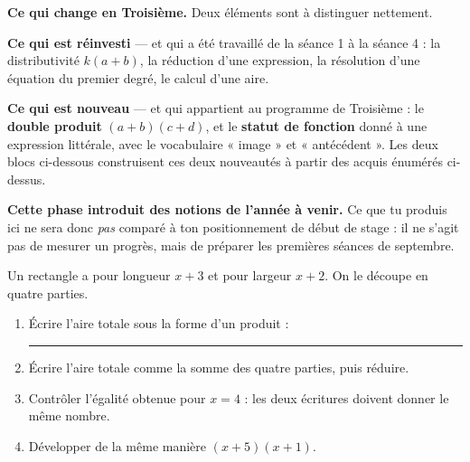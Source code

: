 \documentclass[10pt,a4paper]{article}
\begin{document}
\begin{methodbox}
\textbf{Ce qui change en Troisième.} Deux éléments sont à distinguer nettement.
\par\smallskip
\textbf{Ce qui est réinvesti} — et qui a été travaillé de la séance 1 à la séance 4 : la distributivité
$k(a+b)$, la réduction d'une expression, la résolution d'une équation du premier degré, le calcul d'une aire.
\par\smallskip
\textbf{Ce qui est nouveau} — et qui appartient au programme de Troisième : le \textbf{double produit}
$(a+b)(c+d)$, et le \textbf{statut de fonction} donné à une expression littérale, avec le vocabulaire
« image » et « antécédent ». Les deux blocs ci-dessous construisent ces deux nouveautés à partir des acquis
énumérés ci-dessus.
\end{methodbox}
\begin{warningbox}\small
\textbf{Cette phase introduit des notions de l'année à venir.} Ce que tu produis ici ne sera donc
\emph{pas} comparé à ton positionnement de début de stage : il ne s'agit pas de mesurer un progrès,
mais de préparer les premières séances de septembre.
\end{warningbox}


Un rectangle a pour longueur $x+3$ et pour largeur $x+2$. On le découpe en quatre parties.
\begin{center}
\end{center}
\begin{enumerate}
\item Écrire l'aire totale sous la forme d'un produit : \rule{55mm}{0.32pt}
\item Écrire l'aire totale comme la somme des quatre parties, puis réduire.
\item Contrôler l'égalité obtenue pour $x = 4$ : les deux écritures doivent donner le même nombre.
\item Développer de la même manière $(x+5)(x+1)$.
\end{enumerate}
\end{document}
